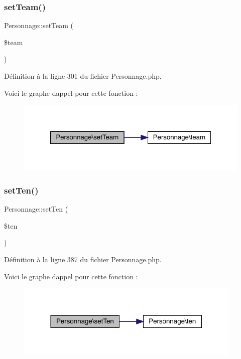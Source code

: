 \subsubsection{\texorpdfstring{set\+Team()}{setTeam()}}
{\footnotesize\ttfamily Personnage\+::set\+Team (\begin{DoxyParamCaption}\item[{}]{\$team }\end{DoxyParamCaption})}



Définition à la ligne 301 du fichier Personnage.\+php.

Voici le graphe d\textquotesingle{}appel pour cette fonction \+:\nopagebreak
\begin{figure}[H]
\begin{center}
\leavevmode
\includegraphics[width=321pt]{class_personnage_aaa13eb033ef4a4e116dc223942cc8e37_cgraph}
\end{center}
\end{figure}
\mbox{\label{class_personnage_a702ca446b0795d57cb94b11b249468f2}} 
\subsubsection{\texorpdfstring{set\+Ten()}{setTen()}}
{\footnotesize\ttfamily Personnage\+::set\+Ten (\begin{DoxyParamCaption}\item[{}]{\$ten }\end{DoxyParamCaption})}



Définition à la ligne 387 du fichier Personnage.\+php.

Voici le graphe d\textquotesingle{}appel pour cette fonction \+:\nopagebreak
\begin{figure}[H]
\begin{center}
\leavevmode
\includegraphics[width=305pt]{class_personnage_a702ca446b0795d57cb94b11b249468f2_cgraph}
\end{center}
\end{figure}
\mbox{\label{class_personnage_a26cd731a784eaa1ba1e9873219612598}} 
